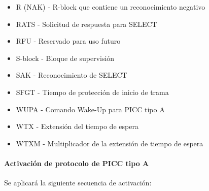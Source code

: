 \begin{itemize}
	\item R (NAK) - R-block que contiene un reconocimiento negativo\par

	\item RATS - Solicitud de respuesta para SELECT\par

	\item RFU - Reservado para uso futuro\par

	\item S-block - Bloque de supervisión\par

	\item SAK - Reconocimiento de SELECT\par

	\item SFGT - Tiempo de protección de inicio de trama\par

	\item WUPA - Comando Wake-Up para PICC tipo A\par

	\item WTX - Extensión del tiempo de espera\par

	\item WTXM - Multiplicador de la extensión de tiempo de espera
\end{itemize}\par

\paragraph{Activación de protocolo de PICC tipo A}
Se aplicará la siguiente secuencia de activación: \par

